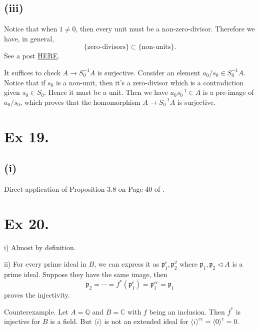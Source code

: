 \subsection{(iii)} %

Notice that when $1\neq 0$, then every unit must be a non-zero-divisor. Therefore we have, in general, \[\{\text{zero-divisors}\}\subset\{\text{non-units}\}.\]
See a post \href{https://math.stackexchange.com/questions/2062615/can-an-element-in-a-ring-with-unity-be-both-a-unit-and-zero-divisor}{HERE}.

It suffices to check $A\to S_0^{-1}A$ is surjective. Consider an element $a_0/s_0\in S_0^{-1}A$. Notice that if $s_0$ is a non-unit, then it's a zero-divisor which is a contradiction given $s_0\in S_0$. Hence it must be a unit. Then we have $a_0s_0^{-1}\in A$ is a pre-image of $a_0/s_0$, which proves that the homomorphism $A\to S_0^{-1}A$ is surjective. 

\section{Ex 19.}

\subsection{(i)} 
Direct application of Proposition 3.8 on Page 40 of \cite{atiyah1994introduction}. 

\section{Ex 20.}

i) Almost by definition.

ii) For every prime ideal in $B$, we can express it as $\mathfrak p_1^e,\mathfrak p_2^2$ where $\mathfrak p_1,\mathfrak p_2\triangleleft A$ is a prime ideal. Suppose they have the same image, then
\[\mathfrak p_2=\cdots=f^{\ast}(\mathfrak p_1^e)=\mathfrak p_1^{ec}=\mathfrak p_1\] proves the injectivity. 

Counterexample. Let $A=\mathbb Q$ and $B=\mathbb C$ with $f$ being an inclusion. Then $f^{\ast}$ is injective for $B$ is a field. But $\langle i\rangle$ is not an extended ideal for $\langle i\rangle^{ce}=\langle 0\rangle ^e=0$.